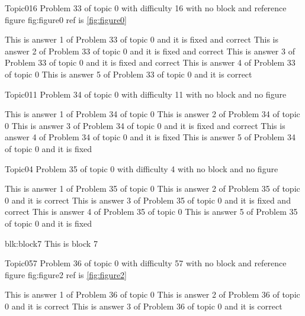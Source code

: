 \documentclass[master]{exam}
\begin{document}
\begin{problem}{Topic0}{16}
	Problem 33 of topic 0 with difficulty 16 with no block and reference figure fig:figure0 ref is \ref{fig:figure0}
	\begin{answers}
		 This is answer 1 of Problem 33 of topic 0 and it is fixed and correct
		 This is answer 2 of Problem 33 of topic 0 and it is fixed and correct
		 This is answer 3 of Problem 33 of topic 0 and it is fixed and correct
		\answer This is answer 4 of Problem 33 of topic 0 
		\answer[correct] This is answer 5 of Problem 33 of topic 0 and it is correct
	\end{answers}
\end{problem}

\begin{problem}{Topic0}{11}
	Problem 34 of topic 0 with difficulty 11 with no block and no figure
	\begin{answers}
		\answer This is answer 1 of Problem 34 of topic 0 
		\answer This is answer 2 of Problem 34 of topic 0 
		 This is answer 3 of Problem 34 of topic 0 and it is fixed and correct
		\answer[fixed] This is answer 4 of Problem 34 of topic 0 and it is fixed
		\answer[fixed] This is answer 5 of Problem 34 of topic 0 and it is fixed
	\end{answers}
\end{problem}

\begin{problem}{Topic0}{4}
	Problem 35 of topic 0 with difficulty 4 with no block and no figure
	\begin{answers}
		\answer This is answer 1 of Problem 35 of topic 0 
		\answer[correct] This is answer 2 of Problem 35 of topic 0 and it is correct
		 This is answer 3 of Problem 35 of topic 0 and it is fixed and correct
		\answer This is answer 4 of Problem 35 of topic 0 
		\answer[fixed] This is answer 5 of Problem 35 of topic 0 and it is fixed
	\end{answers}
\end{problem}



\begin{block}{blk:block7}
This is block 7
\end{block}


\begin{problem}{Topic0}{57}
	Problem 36 of topic 0 with difficulty 57 with no block and reference figure fig:figure2 ref is \ref{fig:figure2}
	\begin{answers}
		\answer This is answer 1 of Problem 36 of topic 0 
		\answer[correct] This is answer 2 of Problem 36 of topic 0 and it is correct
		\answer[correct] This is answer 3 of Problem 36 of topic 0 and it is correct
	\end{answers}
\end{problem}
\end{document}
